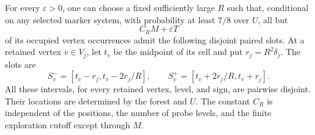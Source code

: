\begin{lemma}\label{arm:regular-slots}
For every $\varepsilon>0$, one can choose a fixed sufficiently large
$R$ such that, conditional on any selected marker system, with
probability at least $7/8$ over $U$, all but
\begin{equation}\label{arm:regular-deletion}
 C_R M+\varepsilon T
\end{equation}
of its occupied vertex occurrences admit the following disjoint paired
slots.  At a retained vertex $v\in V_j$, let $t_v$ be the midpoint of
its cell and put $r_j=R^2\delta_j$.  The slots are
\begin{equation}\label{arm:paired-slots}
 S_v^-=[t_v-r_j,t_v-2r_j/R],
 \qquad
 S_v^+=[t_v+2r_j/R,t_v+r_j].
\end{equation}
All these intervals, for every retained vertex, level, and sign, are
pairwise disjoint.  Their locations are determined by the forest and
$U$.  The constant $C_R$ is independent of the positions, the number of
probe levels, and the finite exploration cutoff except through $M$.
\end{lemma}
